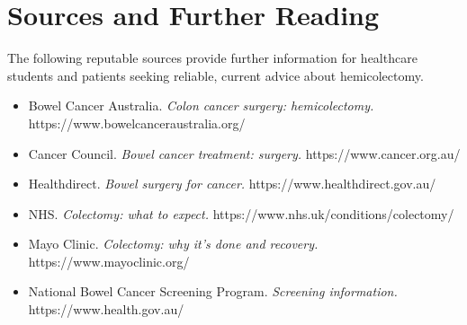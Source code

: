 \section*{Sources and Further Reading}
The following reputable sources provide further information for healthcare students and patients seeking reliable, current advice about hemicolectomy.

\begin{itemize}
    \item Bowel Cancer Australia. \textit{Colon cancer surgery: hemicolectomy.} https://www.bowelcanceraustralia.org/
    \item Cancer Council. \textit{Bowel cancer treatment: surgery.} https://www.cancer.org.au/
    \item Healthdirect. \textit{Bowel surgery for cancer.} https://www.healthdirect.gov.au/
    \item NHS. \textit{Colectomy: what to expect.} https://www.nhs.uk/conditions/colectomy/
    \item Mayo Clinic. \textit{Colectomy: why it's done and recovery.} https://www.mayoclinic.org/
    \item National Bowel Cancer Screening Program. \textit{Screening information.} https://www.health.gov.au/
\end{itemize}
